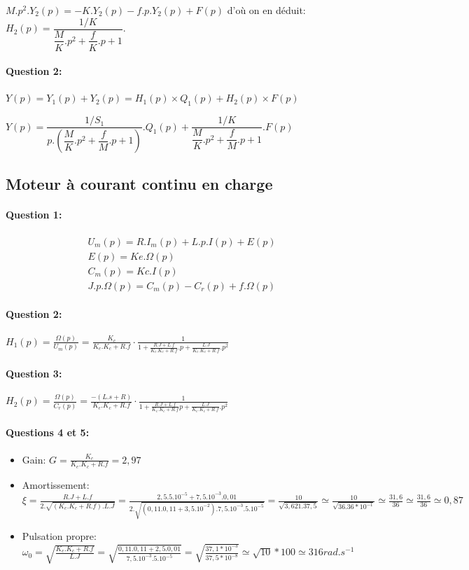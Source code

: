 $M.p^2.Y_2(p)=-K.Y_2(p)-f.p.Y_2(p)+F(p)$ d'où on en déduit: $H_2(p)=\dfrac{1/K}{\dfrac{M}{K}.p^2+\dfrac{f}{K}.p+1}$.

\paragraph{Question 2:}

$Y(p)=Y_1(p)+Y_2(p)=H_1(p)\times Q_1(p)+H_2(p)\times F(p)$

$Y(p)=\dfrac{1/S_1}{p.\left(\dfrac{M}{K}.p^2+\dfrac{f}{M}.p+1\right)}.Q_1(p)+
\dfrac{1/K}{\dfrac{M}{K}.p^2+\dfrac{f}{M}.p+1}.F(p)$

\subsection{Moteur à courant continu en charge}

\paragraph{Question 1:} 

\begin{eqnarray}
U_m(p)=R.I_m(p)+L.p.I(p)+E(p) \\
E(p)=Ke.\Omega(p) \\
C_m(p)=Kc.I(p) \\
J.p.\Omega(p)=C_m(p)-C_r(p)+f.\Omega(p)
\end{eqnarray}

\paragraph{Question 2:} $H_1(p)=\frac{{\Omega}(p)}{{U}_{m}(p)}=\frac{K_c}{K_e.K_c+R.f} \cdot \frac{1}{1+\frac{R.J+L.f}{K_e.K_c+R.f}.p+\frac{L.J}{K_e.K_c+R.f}.p^2}$

\paragraph{Question 3:} $H_2(p)=\frac{{\Omega}(p)}{C_r(p)}=\frac{-(L.s+R)}{K_e.K_c+R.f} \cdot \frac{1}{1+\frac{R.J+L.f}{K_e.K_c+R.f}p+\frac{L.J}{K_e.K_c+R.f}.p^2}$

\paragraph{Questions 4 et 5:} 

\begin{itemize}
	\item Gain:  $G=\frac{K_c}{K_e.K_c+R.f}=2,97$
	\item Amortissement: $\xi=\frac{R.J+L.f}{2.\sqrt{(K_e.K_c+R.f).L.J}}=\frac{2,5.5.10^{-5}+7,5.10^{-3}.0,01}{2.\sqrt{(0,11.0,11+3,5.10^{-2}).7,5.10^{-3}.5.10^{-5}}}=\frac{10}{\sqrt{3,621.37,5}}\simeq\frac{10}{\sqrt{36.36*10^{-1}}}\simeq\frac{31,6}{36}\simeq\frac{31,6}{36}\simeq0,87$
	\item Pulsation propre: $\omega_0=\sqrt{\frac{K_e.K_c+R.f}{L.J}}=\sqrt{\frac{0,11.0,11+2,5.0,01}{7,5.10^{-3}.5.10^{-5}}}=
\sqrt{\frac{37,1*10^{-3}}{37,5*10^{-8}}}\simeq\sqrt{10}*100\simeq 316rad.s^{-1}$
\end{itemize}

